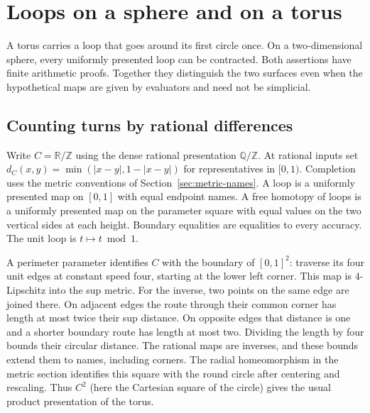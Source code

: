\section{Loops on a sphere and on a torus}\label{sec:loop}
A torus carries a loop that goes around its first circle once. On a two-dimensional sphere, every uniformly presented loop can be contracted. Both assertions have finite arithmetic proofs. Together they distinguish the two surfaces even when the hypothetical maps are given by evaluators and need not be simplicial.

\subsection{Counting turns by rational differences}
Write $C=\mathbb R/\mathbb Z$ using the dense rational presentation $\mathbb Q/\mathbb Z$. At rational inputs set
$d_C(x,y)=\min(|x-y|,1-|x-y|)$ for representatives in $[0,1)$. Completion uses the metric conventions of Section~\ref{sec:metric-names}. A loop is a uniformly presented map on $[0,1]$ with equal endpoint names. A free homotopy of loops is a uniformly presented map on the parameter square with equal values on the two vertical sides at each height. Boundary equalities are equalities to every accuracy. The unit loop is $t\mapsto t\bmod 1$.

A perimeter parameter identifies $C$ with the boundary of $[0,1]^2$: traverse its four unit edges at constant speed four, starting at the lower left corner. This map is $4$-Lipschitz into the sup metric. For the inverse, two points on the same edge are joined there. On adjacent edges the route through their common corner has length at most twice their sup distance. On opposite edges that distance is one and a shorter boundary route has length at most two. Dividing the length by four bounds their circular distance. The rational maps are inverses, and these bounds extend them to names, including corners. The radial homeomorphism in the metric section identifies this square with the round circle after centering and rescaling. Thus $C^2$ (here the Cartesian square of the circle) gives the usual product presentation of the torus.


